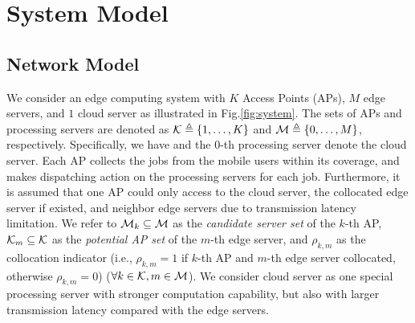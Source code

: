 \section{System Model}
\label{sec:model}

\subsection{Network Model}
We consider an edge computing system with $K$ Access Points (APs), $M$ edge servers, and $1$ cloud server as illustrated in Fig.\ref{fig:system}.
The sets of APs and processing servers are denoted as $\mathcal{K} \triangleq \{1,\dots,K\}$ and $\mathcal{M} \triangleq \{0,\dots,M\}$, respectively.
Specifically, we have  and the $0$-th processing server denote the cloud server.
Each AP collects the jobs from the mobile users within its coverage, and makes dispatching action on the processing servers for each job.
Furthermore, it is assumed that one AP could only access to the cloud server, the collocated edge server if existed, and neighbor edge servers  due to transmission latency limitation.
We refer to $\mathcal{M}_{k} \subseteq \mathcal{M}$ as the \emph{candidate server set} of the $k$-th AP,  $\mathcal{K}_{m} \subseteq \mathcal{K}$ as the \emph{potential AP set} of the $m$-th edge server, and $\rho_{k,m}$ as the collocation indicator (i.e., $\rho_{k,m}=1$ if $k$-th AP and $m$-th edge server collocated, otherwise $\rho_{k,m}=0$) ($\forall k\in\mathcal{K}, m\in\mathcal{M}$).
We consider cloud server as one special processing server with stronger computation capability, but also with larger transmission latency compared with the edge servers.

